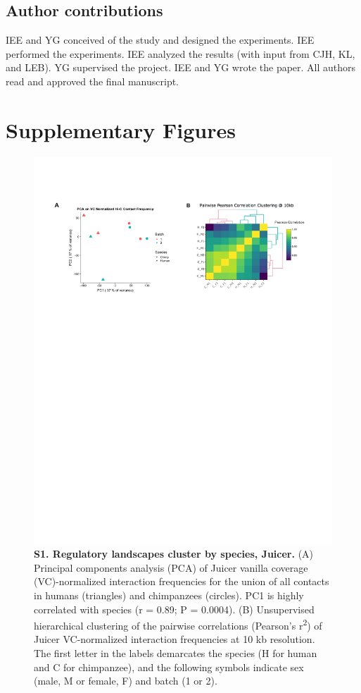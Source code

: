 \subsection{Author contributions}

IEE and YG conceived of the study and designed the experiments. IEE performed the experiments. IEE analyzed the results (with input from CJH, KL, and LEB). YG supervised the project. IEE and YG wrote the paper. All authors read and approved the final manuscript.

\pagebreak
\clearpage

\section{Supplementary Figures}\label{ch02-supplementary-figures}

\begin{figure}[!htb]
\centering
\includegraphics[width=6in]{img/figS1.pdf}
\caption[Regulatory landscapes cluster by species, Juicer.]{\textbf{S1. Regulatory landscapes cluster by species, Juicer.} (A) Principal components analysis (PCA) of Juicer vanilla coverage (VC)-normalized interaction frequencies for the union of all contacts in humans (triangles) and chimpanzees (circles). PC1 is highly correlated with species (r = 0.89; P = 0.0004). (B) Unsupervised hierarchical clustering of the pairwise correlations (Pearson's r\textsuperscript{2}) of Juicer VC-normalized interaction frequencies at 10 kb resolution. The first letter in the labels demarcates the species (H for human and C for chimpanzee), and the following symbols indicate sex (male, M or female, F) and batch (1 or 2).}
\label{fig:ch02-figS1}
\end{figure}

